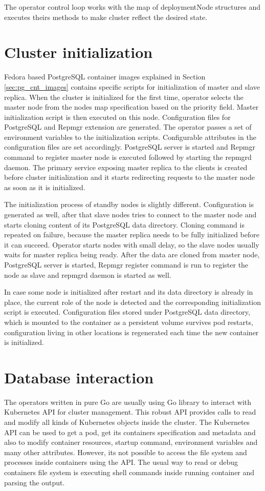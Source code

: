 \documentclass[
  digital, %
  twoside, %
  table,   %
  lof,     %
  lot,     %
]{fithesis3}
\begin{document}
 The operator control loop works with the map of deploymentNode structures and executes theirs methods to make cluster reflect the desired state.

\section{Cluster initialization}
Fedora based PostgreSQL container images explained in Section \ref{sec:pg_cnt_images} contains specific scripts for initialization of master and slave replica. When the cluster is initialized for the first time, operator selects the master node from the nodes map specification based on the priority field. Master initialization script is then executed on this node. Configuration files for PostgreSQL and Repmgr extension are generated. The operator passes a set of environment variables to the initialization scripts. Configurable attributes in the configuration files are set accordingly. PostgreSQL server is started and Repmgr command to register master node is executed followed by starting the repmgrd daemon. The primary service exposing master replica to the clients is created before cluster initialization and it starts redirecting requests to the master node as soon as it is initialized.

The initialization process of standby nodes is slightly different. Configuration is generated as well, after that slave nodes tries to connect to the master node and starts cloning content of its PostgreSQL data directory. Cloning command is repeated on failure, because the master replica needs to be fully initialized before it can succeed. Operator starts nodes with small delay, so the slave nodes usually waits for master replica being ready. After the data are cloned from master node, PostgreSQL server is started, Repmgr register command is run to register the node as slave and repmgrd daemon is started as well.

In case some node is initialized after restart and its data directory is already in place, the current role of the node is detected and the corresponding initialization script is executed. Configuration files stored under PostgreSQL data directory, which is mounted to the container as a persistent volume survives pod restarts, configuration living in other locations is regenerated each time the new container is initialized.

\section{Database interaction}
The operators written in pure Go are usually using Go library to interact with Kubernetes API \cite{k8s-api} for cluster management. This robust API provides calls to read and modify all kinds of Kubernetes objects inside the cluster. The Kubernetes API can be used to get a pod, get its containers specification and metadata and also to modify container resources, startup command, environment variables and many other attributes. However, its not possible to access the file system and processes inside containers using the API. The usual way to read or debug containers file system is executing shell commands inside running container and parsing the output.
\end{document}
